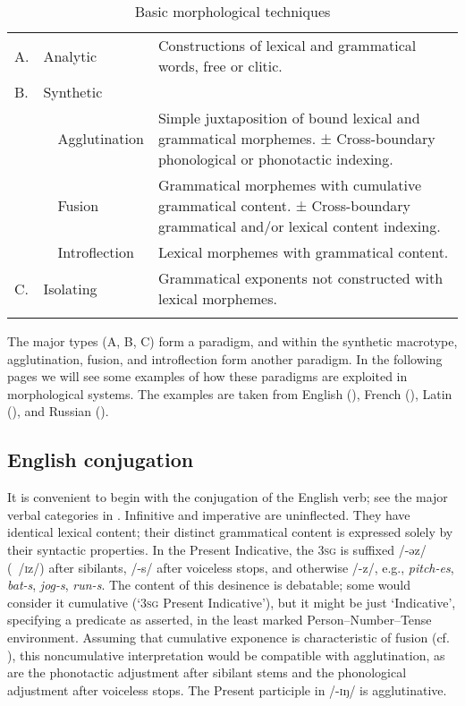 \documentclass[output=paper, colorlinks,citecolor=brown]{langsci/langscibook}
\begin{document}
\begin{table}
\caption{Basic morphological techniques}
\label{tab:andersen_6}
\begin{tabularx}{\textwidth}{llQ}
\lsptoprule
A.& Analytic & Constructions of lexical and grammatical words, free or clitic.\\
B.& Synthetic & \\
  & ~~Agglutination & Simple juxtaposition of bound lexical and grammatical morphemes. \newline ± Cross-boundary phonological or phonotactic indexing.\\
  & ~~Fusion & Grammatical morphemes with cumulative grammatical content.  \newline ± Cross-boundary grammatical and/or lexical content indexing.\\
  & ~~Introflection & Lexical morphemes with grammatical content.\\
C.& Isolating & Grammatical exponents not constructed with lexical morphemes.\\
\lspbottomrule
\end{tabularx}
\end{table}

\begin{sloppypar}
The major types (A, B, C) form a paradigm, and within the synthetic macrotype, agglutination, fusion, and introflection form another paradigm. In the following pages we will see some examples of how these paradigms are exploited in morphological systems. The examples are taken from English (), French (), Latin (), and Russian ().
\end{sloppypar}

\subsection{English conjugation} \label{english_conjugation}\largerpage

It is convenient to begin with the conjugation of the English verb; see the major verbal categories in . Infinitive and imperative are uninflected. They have identical lexical content; their distinct grammatical content is expressed solely by their syntactic properties. In the Present Indicative, the \textsc{3sg} is suffixed /-ǝz/ \mbox{({\textbar}{\textbar} /\textsc{i}z/)} after sibilants, /-s/ after voiceless stops, and otherwise /-z/, e.g., \textit{pitch-es}, \textit{bat-s}, \textit{jog-s}, \textit{run-s}. The content of this desinence is debatable; some would consider it cumulative (`\textsc{3sg} Present Indicative'), but it might be just `Indicative', specifying a predicate as asserted, in the least marked Person–Number–Tense environment. Assuming that cumulative exponence is characteristic of fusion (cf. ), this noncumulative interpretation would be compatible with agglutination, as are the phonotactic adjustment after sibilant stems and the phonological adjustment after voiceless stops. The Present participle in /-\textsc{i}ŋ/ is agglutinative. 
\end{document}
